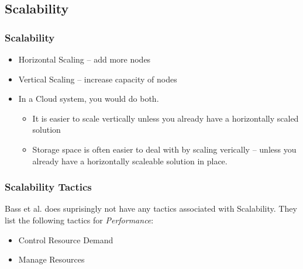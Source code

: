 \documentclass[10pt]{beamer}
\begin{document}
\subsection{Scalability}
\begin{frame}[t]
\frametitle{Scalability}
\begin{itemize}
\item Horizontal Scaling -- add more nodes
\item Vertical Scaling -- increase capacity of nodes
\item In a Cloud system, you would do both.
\begin{itemize}
\item It is easier to scale vertically unless you already have a horizontally scaled solution
\item Storage space is often easier to deal with by scaling verically -- unless you already have a horizontally scaleable solution in place.
\end{itemize}

\end{itemize}
\end{frame}

\begin{frame}[t]
\frametitle{Scalability Tactics}
Bass et al. does suprisingly not have any tactics associated with Scalability. They list the following tactics for \emph{Performance}:
\begin{itemize}
\item Control Resource Demand
\item Manage Resources
\end{itemize}

\end{frame}
\end{document}

